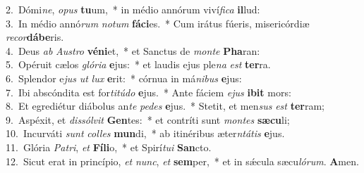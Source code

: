 {2.~}Dómi\textit{ne}, \textit{o}\textit{pus} \textbf{tu}um,~* in médio annórum viví\textit{fi}\textit{ca} \textbf{il}lud:\\
{3.~}In médio annó\textit{rum} \textit{no}\textit{tum} \textbf{fá}\textbf{ci}es.~* Cum irátus fúeris, misericórdiæ \textit{re}\textit{cor}\textbf{dá}\textbf{be}ris.\\
{4.~}Deus \textit{ab} \textit{Au}\textit{stro} \textbf{vé}\textbf{ni}et,~* et Sanctus de \textit{mon}\textit{te} \textbf{Pha}ran:\\
{5.~}Opéruit cælos \textit{gló}\textit{ri}\textit{a} \textbf{e}jus:~* et laudis ejus ple\textit{na} \textit{est} \textbf{ter}ra.\\
{6.~}Splendor e\textit{jus} \textit{ut} \textit{lux} \textbf{e}rit:~* córnua in má\textit{ni}\textit{bus} \textbf{e}jus:\\
{7.~}Ibi abscóndita est for\textit{ti}\textit{tú}\textit{do} \textbf{e}jus.~* Ante fáciem \textit{e}\textit{jus} \textbf{i}\textbf{bit} mors:\\
{8.~}Et egrediétur diábolus an\textit{te} \textit{pe}\textit{des} \textbf{e}jus.~* Stetit, et men\textit{sus} \textit{est} \textbf{ter}ram;\\
{9.~}Aspéxit, et \textit{dis}\textit{sól}\textit{vit} \textbf{Gen}tes:~* et contríti sunt \textit{mon}\textit{tes} \textbf{sæ}\textbf{cu}li;\\
{10.~}Incurváti \textit{sunt} \textit{col}\textit{les} \textbf{mun}di,~* ab itinéribus æter\textit{ntá}\textit{tis} \textbf{e}jus.\\
{11.~}Glória \textit{Pa}\textit{tri}, \textit{et} \textbf{Fí}\textbf{li}o,~* et Spirí\textit{tu}\textit{i} \textbf{San}cto.\\
{12.~}Sicut erat in princípio, \textit{et} \textit{nunc}, \textit{et} \textbf{sem}per,~* et in sǽcula sæcu\textit{ló}\textit{rum}. \textbf{A}men.\\
